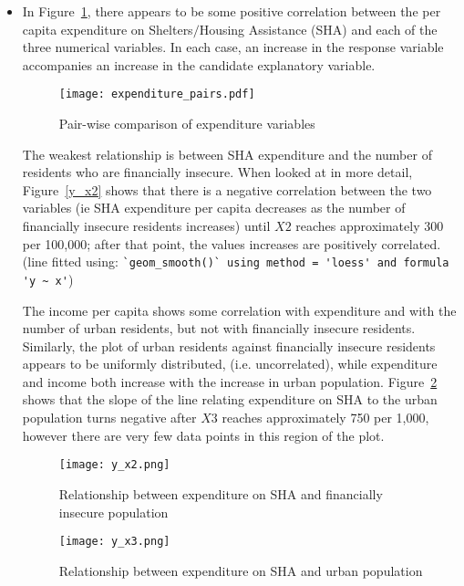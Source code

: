 \documentclass[12pt,letterpaper]{article}
\begin{document}
	\vspace{.5cm}
	\vspace{.5cm}
	  
	\vspace{.5cm}
	\begin{itemize}
		
		\item
		In Figure~\ref{pairs}, there appears to be some positive correlation between
		the per capita expenditure on Shelters$/$Housing Assistance (SHA) and each of the three
		numerical variables.  In each case, an increase in the response variable accompanies an
		increase in the candidate explanatory variable.  
		
		\begin{figure}
		  \texttt{[image: expenditure\_pairs.pdf]}
		  \caption{Pair-wise comparison of expenditure variables}\label{pairs}
		\end{figure}
		
		The weakest relationship is between SHA expenditure and the number of residents 
		who are financially insecure.  When looked at in more detail,  Figure~\ref{y_x2} shows that
		there is a negative correlation between the two variables (ie SHA expenditure per capita
		decreases as the number of financially insecure residents increases) until $X2$ reaches
		approximately 300 per 100,000;
		after that point, the values increases are positively correlated.  (line fitted using:
		\verb|`geom_smooth()` using method = 'loess' and formula 'y ~ x'|)


		The income per capita shows some correlation with expenditure and with the number of
		urban residents, but not with financially insecure residents.  Similarly, the plot of
		urban residents against financially insecure residents appears to be uniformly distributed,
		(i.e. uncorrelated), while expenditure and income both increase with the increase in urban
		population.  
		Figure~\ref{y_x3} shows that the slope of the line relating expenditure on SHA to the urban
		population turns negative after $X3$ reaches approximately 750 per 1,000, however there are
		very few data points in this region of the plot.

		\begin{figure}
		  \texttt{[image: y\_x2.png]}
		  \caption{Relationship between expenditure on SHA and financially insecure 
		  population }\label{y_x2}
		  \texttt{[image: y\_x3.png]}
		  \caption{Relationship between expenditure on SHA and urban population }\label{y_x3}
		\end{figure}
		

\end{itemize}
\end{document}
